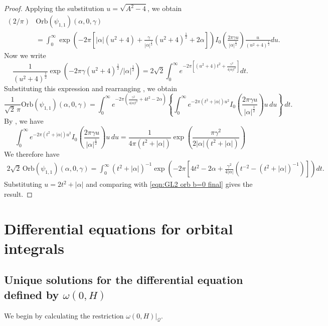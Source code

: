 \documentclass[reqno, 11pt]{amsart} %
\numberwithin{equation}{section}
\theoremstyle{plain}
\theoremstyle{definition}
\theoremstyle{remark}
\newcommand{\mcQ}{\mathcal{Q}}
\newcommand{\Orb}{\mathrm{Orb}}
\begin{document}
\begin{proof}
Applying the substitution $u = \sqrt{A^2 - 4}$, we obtain
\begin{align*}
(2  / \pi )&\Orb(\psi_{1,1})(\alpha, 0, \gamma) \\
&= \int_0^{\infty} \exp \left( - 2 \pi \left[ |\alpha|(u^2 + 4) + \frac{\gamma}{|\alpha|^{\frac12}} (u^2 + 4)^{\frac12} + 2 \alpha \right] \right) I_0 \left( \frac{ 2 \pi \gamma u}{|\alpha|^{\frac12}} \right)   \frac{u}{(u^2 + 4)^{\frac12}} du.
\end{align*}
Now we write
\[
\frac{1}{(u^2 + 4)^{\frac12}} \exp \left( - 2 \pi \gamma(u^2 + 4)^{\frac12}/ |\alpha|^{\frac12}  \right) = 2 \sqrt 2 \int_0^{\infty} e^{-2\pi \left[  (u^2 + 4)t^2 + \frac{\gamma^2}{4|\alpha| t^2} \right] } dt.
\]
Substituting this expression and rearranging , we obtain
\[
\frac{1}{\sqrt{2} \, {\pi}} \Orb(\psi_{1,1})(\alpha, 0, \gamma) =  \int_0^{\infty} e^{ - 2 \pi \left( \frac{\gamma^2}{4 |\alpha| t^2}  + 4 t^2 - 2 \alpha \right) } \left\{ \int_0^{\infty} e^{-2 \pi (t^2 + |\alpha|)  u^2} I_0 \left( \frac{ 2 \pi \gamma u}{|\alpha|^{\frac12}} \right)   u  \, du \right\}   \, dt.
\]
By \cite[(10.43.23)]{NIST:DLMF}, we have
\[
\int_0^{\infty} e^{-2 \pi (t^2 + |\alpha|)  u^2} I_0 \left( \frac{ 2 \pi \gamma u}{|\alpha|^{\frac12}} \right)   u  \, du = \frac{1}{4 \pi (t^2+|\alpha|)} \exp \left( \frac{ \pi \gamma^2}{2 |\alpha|(t^2+|\alpha|)} \right)
\]
We therefore have
\begin{align*}
2 \sqrt 2  \, \Orb(\psi_{1,1}) (\alpha, 0, \gamma) = \int_0^{\infty} (t^2 + |\alpha|)^{-1}  \exp \left( - 2 \pi \left[ 4t^2 - 2 \alpha + \frac{\gamma^2}{4|\alpha|} (t^{-2} - (t^2 + |\alpha|)^{-1}) \right] \right)  dt.
\end{align*}
Substituting $u = 2 t^2 + |\alpha|$ and comparing with \eqref{eqn:GL2 orb b=0 final} gives the result.
\end{proof}




\section{Differential equations for orbital integrals}

\subsection{Unique solutions for the differential equation defined by $ω(0,H)$}

We begin by calculating the restriction $ω(0,H)\vert_\mcQ$.
\end{document}
